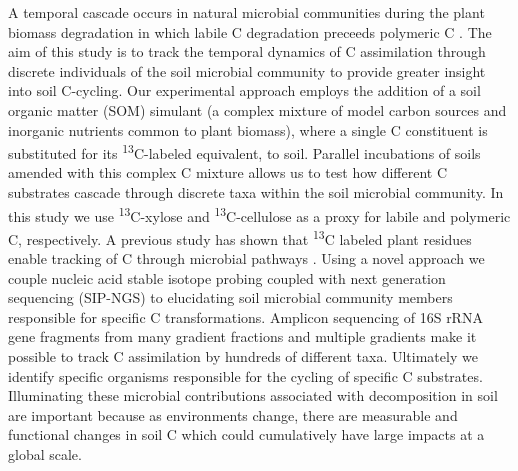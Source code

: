 A temporal cascade occurs in natural microbial communities during the plant biomass degradation in which labile C degradation preceeds polymeric C \cite{Hu_1997,Rui_2009}. The aim of this study is to track the temporal dynamics of C assimilation through discrete individuals of the soil microbial community to provide greater insight into soil C-cycling. Our experimental approach employs the addition of a soil organic matter (SOM) simulant (a complex mixture of model carbon sources and inorganic nutrients common to plant biomass), where a single C constituent is substituted for its \textsuperscript{13}C-labeled equivalent, to soil. Parallel incubations of soils amended with this complex C mixture allows us to test how different C substrates cascade through discrete taxa within the soil microbial community. In this study we use \textsuperscript{13}C-xylose and \textsuperscript{13}C-cellulose as a proxy for labile and polymeric C, respectively. A previous study has shown that \textsuperscript{13}C labeled plant residues enable tracking of C through microbial pathways \cite{Evershed_2006}. Using a novel approach we couple nucleic acid stable isotope probing coupled with next generation sequencing (SIP-NGS) to elucidating soil microbial community members responsible for specific C transformations. Amplicon sequencing of 16S rRNA gene fragments from many gradient fractions and multiple gradients make it possible to track C assimilation by hundreds of different taxa. Ultimately we identify specific organisms responsible for the cycling of specific C substrates. Illuminating these microbial contributions associated with decomposition in soil are important because as environments change, there are measurable and functional changes in soil C \cite{Grandy_2008} which could cumulatively have large impacts at a global scale.

